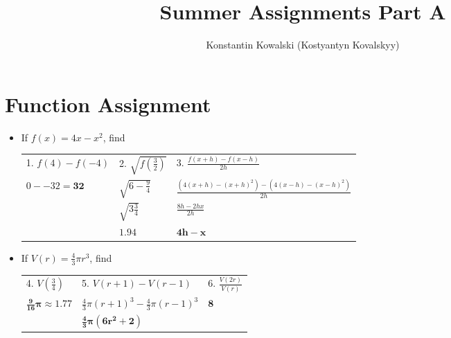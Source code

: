\documentclass[a4paper]{article}
\begin{document}
   \title{Summer Assignments Part A} 
   \author{ Konstantin Kowalski (Kostyantyn Kovalskyy) \\ \texttt{} }
   \maketitle

   \section{Function Assignment}

   \begin{itemize} \itemsep 3em

   \item
      If $ f(x) = 4x-x^2 $, find

      \begin{tabular}{ p{5cm} p{5cm} p{5cm} }
         1. $ f(4)-f(-4)                  $&
         2. $ \sqrt{ f( \frac{3}{2} ) }   $&
         3. $ \frac{ f(x+h)-f(x-h) }{ 2h }$
      \\
         $ 0 - -32 = \bm{32}              $&
         $ \sqrt{ 6 - \frac{9}{4} }       $&
         $ \frac{ (4(x+h)-(x+h)^2) - (4(x-h) - (x-h)^2) }{ 2h } $
      \\
                                           &
         $ \sqrt{ 3 \frac{3}{4} }         $&
         $ \frac{ 8h - 2hx }{ 2h }        $
      \\
                                           & 
         $ \bm{1.94}                      $&
         $ \bm{4h-x}                      $
      \end{tabular}

   \item
      If $ V(r) = \frac{4}{3} \pi r^3 $, find
        
      \begin{tabular}{ p{5cm} p{5cm} p{5cm} }
         4. $ V( \frac{3}{4} )            $&
         5. $ V(r+1)-V(r-1)               $&
         6. $ \frac{ V(2r) }{ V(r) }      $
      \\
         $ \bm{ \frac{9}{16} \pi \approx 1.77 }                $&
         $ \frac{4}{3} \pi (r+1)^3 - \frac{4}{3} \pi (r-1)^3   $&
         $ \bm{8}                                              $
      \\
                                                                &
         $ \bm{ \frac{4}{3} \pi (6r^2 + 2) }                   $
      \end{tabular}
      

\end{itemize}
\end{document}
